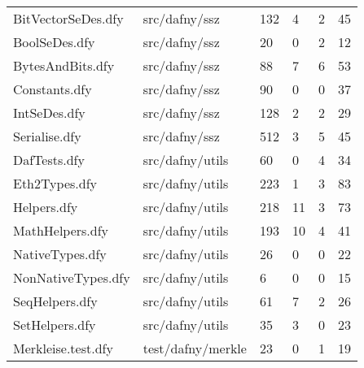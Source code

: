 \documentclass[a4paper, 12pt]{article}
\begin{document}
\begin{tabular}{llllll}
              BitVectorSeDes.dfy &                                  src/dafny/ssz &   132 &        4 &               2 &            45 \\
                   BoolSeDes.dfy &                                  src/dafny/ssz &    20 &        0 &               2 &            12 \\
                BytesAndBits.dfy &                                  src/dafny/ssz &    88 &        7 &               6 &            53 \\
                   Constants.dfy &                                  src/dafny/ssz &    90 &        0 &               0 &            37 \\
                    IntSeDes.dfy &                                  src/dafny/ssz &   128 &        2 &               2 &            29 \\
                   Serialise.dfy &                                  src/dafny/ssz &   512 &        3 &               5 &            45 \\
                    DafTests.dfy &                                src/dafny/utils &    60 &        0 &               4 &            34 \\
                   Eth2Types.dfy &                                src/dafny/utils &   223 &        1 &               3 &            83 \\
                     Helpers.dfy &                                src/dafny/utils &   218 &       11 &               3 &            73 \\
                 MathHelpers.dfy &                                src/dafny/utils &   193 &       10 &               4 &            41 \\
                 NativeTypes.dfy &                                src/dafny/utils &    26 &        0 &               0 &            22 \\
              NonNativeTypes.dfy &                                src/dafny/utils &     6 &        0 &               0 &            15 \\
                  SeqHelpers.dfy &                                src/dafny/utils &    61 &        7 &               2 &            26 \\
                  SetHelpers.dfy &                                src/dafny/utils &    35 &        3 &               0 &            23 \\
              Merkleise.test.dfy &                              test/dafny/merkle &    23 &        0 &               1 &            19 \\

\end{tabular}
\end{document}
